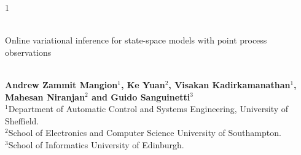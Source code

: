 \documentclass[12pt]{article}
\begin{document}
%

\hspace{13.9cm}1

\ \vspace{20mm}\\

{\LARGE Online variational inference for state-space models with point process observations}

\ \\
{\bf \large Andrew Zammit Mangion$^{\displaystyle 1}$, Ke Yuan$^{\displaystyle 2}$, Visakan Kadirkamanathan$^{\displaystyle 1}$, Mahesan Niranjan$^{\displaystyle 2}$ and Guido Sanguinetti$^{\displaystyle 3}$}\\
{$^{\displaystyle 1}$Department of Automatic Control and Systems Engineering, University of Sheffield.}\\
{$^{\displaystyle 2}$School of Electronics and Computer Science University of Southampton.}\\
{$^{\displaystyle 3}$School of Informatics University of Edinburgh.}
%
\end{document}
